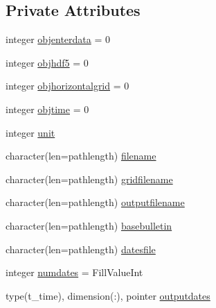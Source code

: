 \subsection*{Private Attributes}
\begin{DoxyCompactItemize}
\item 
integer \mbox{\hyperlink{structmodulehellermanrosensteinascii_1_1t__hellermanrosensteinascii_a64b8b751355ee6f053e1f700c283528b}{objenterdata}} = 0
\item 
integer \mbox{\hyperlink{structmodulehellermanrosensteinascii_1_1t__hellermanrosensteinascii_a32efbc0c86f229b6dd0c1b4d6b031681}{objhdf5}} = 0
\item 
integer \mbox{\hyperlink{structmodulehellermanrosensteinascii_1_1t__hellermanrosensteinascii_a3fa26f6efb207d8a5304368c0816887c}{objhorizontalgrid}} = 0
\item 
integer \mbox{\hyperlink{structmodulehellermanrosensteinascii_1_1t__hellermanrosensteinascii_a270f465d876d5a4d524964ba1bdf1b56}{objtime}} = 0
\item 
integer \mbox{\hyperlink{structmodulehellermanrosensteinascii_1_1t__hellermanrosensteinascii_acf23e574d477b4255d3d54aaf531730b}{unit}}
\item 
character(len=pathlength) \mbox{\hyperlink{structmodulehellermanrosensteinascii_1_1t__hellermanrosensteinascii_aebd2ebb9698064373fdc4b0da0ba34c7}{filename}}
\item 
character(len=pathlength) \mbox{\hyperlink{structmodulehellermanrosensteinascii_1_1t__hellermanrosensteinascii_af10df97d7a69f51d73de48c7a831b9aa}{gridfilename}}
\item 
character(len=pathlength) \mbox{\hyperlink{structmodulehellermanrosensteinascii_1_1t__hellermanrosensteinascii_aeef40000a2fc8a41ffcd751487f4dba9}{outputfilename}}
\item 
character(len=pathlength) \mbox{\hyperlink{structmodulehellermanrosensteinascii_1_1t__hellermanrosensteinascii_a67755850964bbd9338b3b3c4fac7c850}{basebulletin}}
\item 
character(len=pathlength) \mbox{\hyperlink{structmodulehellermanrosensteinascii_1_1t__hellermanrosensteinascii_ae12b05ed9c7053068221ee31e9aa797f}{datesfile}}
\item 
integer \mbox{\hyperlink{structmodulehellermanrosensteinascii_1_1t__hellermanrosensteinascii_a42b880e6e53d733316deb3325ad1eec4}{numdates}} = Fill\+Value\+Int
\item 
type(t\+\_\+time), dimension(\+:), pointer \mbox{\hyperlink{structmodulehellermanrosensteinascii_1_1t__hellermanrosensteinascii_aa20fcdad9cdcf64727c15bb5ac6c6856}{outputdates}}

\end{DoxyCompactItemize}
